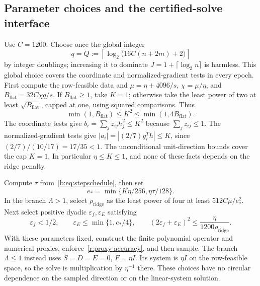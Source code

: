 \documentclass[11pt]{amsart}
\theoremstyle{definition}\newtheorem{definition}[theorem]{Definition}
\theoremstyle{remark}\newtheorem{remark}[theorem]{Remark}
\numberwithin{equation}{section}
\begin{document}
\subsection{Parameter choices and the certified-solve interface}\label{r:parameters}

Use $C=1200$. Choose once the global integer
\[
 q=Q:=\left\lceil\log_2\bigl(16C(n+2m)+2\bigr)\right\rceil
\]
by integer doublings; increasing it to dominate
$J=1+\lceil\log_2n\rceil$ is harmless. This global choice covers the coordinate and normalized-gradient tests
in every epoch.
First compute the row-feasible data and
$\mu=\eta+4096/s$, $\chi=\mu/\eta$, and
$B_{\mathrm{flat}}=32C\chi q/s$.
If $B_{\mathrm{flat}}\ge1$, take $K=1$; otherwise take the least power of two
at least $\sqrt{B_{\mathrm{flat}}}$, capped at one, using squared
comparisons. Thus
\[
 \min(1,B_{\mathrm{flat}})\le K^2
       \le\min(1,4B_{\mathrm{flat}}).
\]
The coordinate tests give
$b_i=\sum_jz_{ij}h_j^2\le K^2$ because $\sum_jz_{ij}\le1$.
The normalized-gradient tests give
$|a_i|=|(2/7)g_i^Th|\le K$, since $(2/7)/(10/17)=17/35<1$.
The unconditional unit-direction bounds cover the cap $K=1$.
In particular $\eta\le K\le1$, and none of these facts depends on the
ridge penalty.

Compute $\tau$ from~\eqref{b:eq:stepschedule}, then set
\[
 e_*=\min\{K\eta/256,\eta\tau/128\}.
\]
In the branch $\Lambda>1$, select $\rho_{\mathrm{ridge}}$ as the least
power of four at least $512C\mu/e_*^2$.
Next select positive dyadic $\varepsilon_f,\varepsilon_E$ satisfying
\[
 \varepsilon_f<1/2,\qquad
 \varepsilon_E\le\min\{1,e_*/4\},\qquad
 (2\varepsilon_f+\varepsilon_E)^2
             \le\frac{\eta}{1200\rho_{\mathrm{ridge}}}.
\]
With these parameters fixed, construct the finite polynomial operator
and numerical proxies, enforce~\eqref{r:proxy-accuracy}, and then sample.
The branch $\Lambda\le1$ instead uses $S=D=E=0$, $F=\eta I$.
Its system is $\eta I$ on the row-feasible space, so the solve is
multiplication by $\eta^{-1}$ there. These choices have no circular
dependence on the sampled direction or on the linear-system solution.
\end{document}

